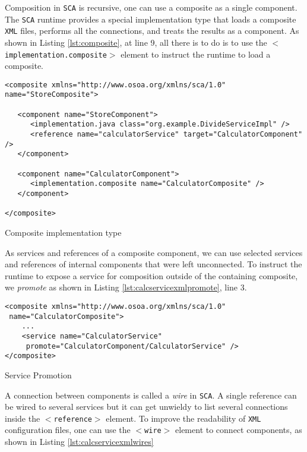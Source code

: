 Composition in \texttt{SCA} is recursive, one can use a composite as a single component. The \texttt{SCA} runtime provides a special implementation
type that loads a composite \texttt{XML} files, performs all the connections, and treats the results as a component. As shown in Listing
\ref{lst:composite}, at line 9, all there is to do is to use the \texttt{$<$implementation.composite$>$} element to instruct the runtime
to load a composite.

\begin{listing}[!htbp]
\begin{verbatim}
<composite xmlns="http://www.osoa.org/xmlns/sca/1.0" name="StoreComposite">

   <component name="StoreComponent">
      <implementation.java class="org.example.DivideServiceImpl" />
      <reference name="calculatorService" target="CalculatorComponent" />
   </component>

   <component name="CalculatorComponent">
      <implementation.composite name="CalculatorComposite" />
   </component>

</composite>
\end{verbatim}
\caption{Composite implementation type}
\label{lst:composite}
\end{listing}

As services and references of a composite component, we can use selected services and references of internal components
that were left unconnected. To instruct the runtime to expose a service for composition outside of the containing composite,
we \emph{promote} as shown in Listing \ref{lst:calcservicexmlpromote}, line 3.

\begin{listing}[!htbp]
\begin{verbatim}
<composite xmlns="http://www.osoa.org/xmlns/sca/1.0"
 name="CalculatorComposite">
    ...
    <service name="CalculatorService"
     promote="CalculatorComponent/CalculatorService" />
</composite>
\end{verbatim}
\caption{Service Promotion}
\label{lst:calcservicexmlpromote}
\end{listing}

A connection between components is called a \emph{wire} in \texttt{SCA}. A single reference can be wired to several services
but it can get unwieldy to list several connections inside the \texttt{$<$reference$>$} element. To improve the readability
of \texttt{XML} configuration files, one can use the \texttt{$<$wire$>$} element to connect components, as shown in Listing 
\ref{lst:calcservicexmlwires}

